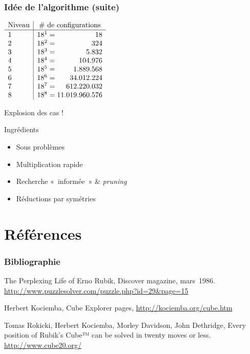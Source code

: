 \documentclass[compress]{beamer}
\begin{document}
\begin{frame} \frametitle{Idée de l'algorithme (suite)}

  \begin{minipage}{0.5\linewidth}
    \begin{math}
      \begin{array}{l|l<{{}}@{}r}
        \text{Niveau}& \multicolumn{2}{c}{\text{\# de configurations}}\\
        \hline
        \rule{0pt}{2.2ex}%
        1& 18^1 =& 18\\
        2& 18^2 =& 324\\
        3& 18^3 =& 5.832\\
        4& 18^4 =& 104.976\\
        5& 18^5 =& 1.889.568\\
        6& 18^6 =& 34.012.224\\
        7& 18^7 =& 612.220.032\\
        8& 18^8 =& 11.019.960.576
      \end{array}
    \end{math}

    \vspace*{2ex}%
    Explosion des cas !
  \end{minipage}
  \hfill
  \begin{minipage}{0.45\linewidth}
    \begin{block}{Ingrédients}
      \begin{itemize}
      \item<2-> Sous problèmes
      \item<3-> Multiplication rapide
      \item<4-> Recherche «~informée~» \& \emph{pruning}
      \item<5-> Réductions par symétries
      \end{itemize}
    \end{block}
  \end{minipage}
\end{frame}

\section{Références}
\begin{frame} \frametitle{Bibliographie}
  \begin{thebibliography}{}

  \bibitem{} The Perplexing Life of Erno Rubik, Discover magazine,
    mars~1986.
    \url{http://www.puzzlesolver.com/puzzle.php?id=29&page=15}


  \bibitem{} Herbert Kociemba, Cube Explorer pages,
    \url{http://kociemba.org/cube.htm}

  \bibitem{} Tomas Rokicki, Herbert Kociemba, Morley Davidson, John
    Dethridge,
    Every position of Rubik's Cube™ can be solved in twenty moves or less. 
    \url{http://www.cube20.org/}
  \end{thebibliography}
\end{frame}
\end{document}
